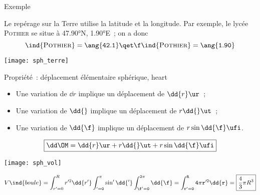 \documentclass[../main/main.tex]{subfiles}
\begin{document}
\begin{rexem}{Exemple}
    \begin{minipage}{0.70\linewidth}
        Le repérage sur la Terre utilise la latitude et la longitude. Par
        exemple, le lycée \textsc{Pothier} se situe à \ang{47.90}N,
        \ang{1.90;;}E~; on a donc
        \[
            \tt\ind{\textsc{Pothier}} = \ang{42.1}
            \qet
            \f\ind{\textsc{Pothier}} = \ang{1.90}
        \]
    \end{minipage}
    \hfill
    \begin{minipage}{0.25\linewidth}
        \begin{center}
            \texttt{[image: sph\_terre]}
        \end{center}
    \end{minipage}
\end{rexem}


\begin{tprop}{Propriété~: déplacement élémentaire sphérique, heart}
    \begin{minipage}{0.70\linewidth}
        \begin{itemize}
            \item Une variation de $\dd{r}$ implique un déplacement de $\dd{r}\ur$~;
            \item Une variation de $\dd{\tt}$ implique un déplacement de
                $r\dd{\tt}\ut$~;
            \item Une variation de $\dd{\f}$ implique un déplacement de
                $r\sin\tt\dd{\f}\ufi$.
        \end{itemize} \bigbreak
    \[\boxed{\dd\OM = \dd{r}\ur + r\dd{\tt}\ut + r\sin\tt\dd{\f}\ufi}\]
    \end{minipage}
    \hfill
    \begin{minipage}{0.29\linewidth}
        \begin{center}
            \texttt{[image: sph\_vol]}
        \end{center}
    \end{minipage}
\end{tprop}

\[V\ind{boule}
    = \int_{r'=0}^{R} r'^2\dd{r'}
        \int_{\tt' = 0}^{\pi} \sin\tt'\dd{\tt'}
        \int_{\f'=0}^{2\pi} \dd{\f}
    = \int_{r'=0}^{R} 4\pi r'^2 \dd{r}
    = \boxed{\frac{4}{3}\pi R^3}
\]
\end{document}
